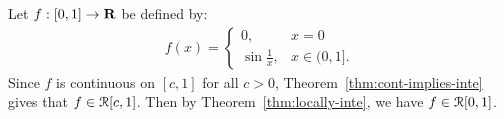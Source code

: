 \documentclass[10pt,twoside,openany]{memoir}
\begin{document}
    \begin{example}
        Let $f:[0,1] \rightarrow \mathbf{R}$ be defined by:
            \begin{equation*}
            \begin{split}
                f(x) =
                \begin{cases}
                    0, & x = 0 \\
                    \sin \frac{1}{x}, & x \in (0,1].
                \end{cases}
            \end{split}
            \end{equation*}
        Since $f$ is continuous on $[c,1]$ for all $c > 0$, Theorem~\ref{thm:cont-implies-inte} gives that $f \in \mathcal{R}[c,1]$. Then by Theorem~\ref{thm:locally-inte}, we have $f \in \mathcal{R}[0,1]$.
    \end{example}
\end{document}
